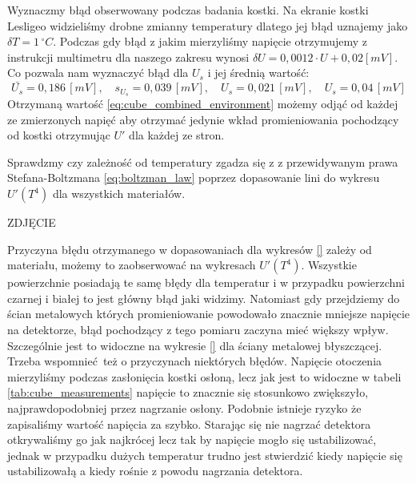 \documentclass[12pt]{article}
\begin{document}
Wyznaczmy błąd obserwowany podczas badania kostki. Na ekranie kostki Lesligeo widzieliśmy drobne zmianny temperatury dlatego jej błąd uznajemy jako $\delta T = 1 \, ^{\circ}C$.
Podczas gdy błąd z jakim mierzyliśmy napięcie otrzymujemy z instrukcji multimetru \cite{radiation_multimeter} dla naszego zakresu wynosi $\delta U = 0{,}0012 \cdot U + 0{,}02 [mV]$.
Co pozwala nam wyznaczyć błąd dla $U_s$ i jej średnią wartość:
\begin{equation}
    \bar{U_s} = 0{,}186 \, [mV], \quad s_{U_s} = 0{,}039 \, [mV], \quad U_s = 0{,}021 \, [mV], \quad U_s = 0{,}04 \, [mV]
    \label{eq:cube_combined_environment}
\end{equation}
Otrzymaną wartość \eqref{eq:cube_combined_environment} możemy odjąć od każdej ze zmierzonych napięć aby otrzymać jedynie wkład promieniowania pochodzący od kostki otrzymując $U'$ dla każdej ze stron.

Sprawdzmy czy zależność od temperatury zgadza się z z przewidywanym prawa Stefana-Boltzmana \eqref{eq:boltzman_law} poprzez dopasowanie lini do wykresu $U'(T^4)$ dla wszystkich materiałów.

ZDJĘCIE

Przyczyna błędu otrzymanego w dopasowaniach dla wykresów \ref{} zależy od materiału, możemy to zaobserwować na wykresach $U'(T^4)$. Wszystkie powierzchnie posiadają te samę błędy dla temperatur i w przypadku powierzchni czarnej i białej to jest główny błąd jaki widzimy.
Natomiast gdy przejdziemy do ścian metalowych których promieniowanie powodowało znacznie mniejsze napięcie na detektorze, błąd pochodzący z tego pomiaru zaczyna mieć większy wpływ. Szczególnie jest to widoczne na wykresie \ref{} dla ściany metalowej błyszczącej.
Trzeba wspomnieć też o przyczynach niektórych błędów. Napięcie otoczenia mierzyliśmy podczas zasłonięcia kostki osłoną, lecz jak jest to widoczne w tabeli \ref{tab:cube_measurements} napięcie to znacznie się stosunkowo zwiększyło, najprawdopodobniej przez nagrzanie osłony.
Podobnie istnieje ryzyko że zapisaliśmy wartość napięcia za szybko. Starając się nie nagrzać detektora otkrywaliśmy go jak najkrócej lecz tak by napięcie mogło się ustabilizować, jednak w przypadku dużych temperatur trudno jest stwierdzić kiedy napięcie się ustabilizowałą a kiedy rośnie z powodu nagrzania detektora.
\end{document}
